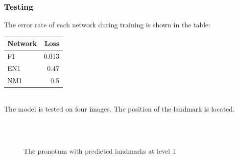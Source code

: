 \subsubsection{Testing}
The error rate of each network during training is shown in the table:\\
\begin{table}[h!]
	\centering
	\begin{tabular}{l r}
	Network & Loss \\ \hline
	F1 & 0.013 \\ \hline
	EN1 & 0.47\\ \hline
	NM1 &  0.5
	\end{tabular}
\end{table}\\
The model is tested on four images. The position of the landmark is located.
\begin{figure}[h!]
\centering
{}~~
\\
~~
\\
\caption{The pronotum with predicted landmarks at level 1}
\label{figcentroidSize}
\end{figure}

